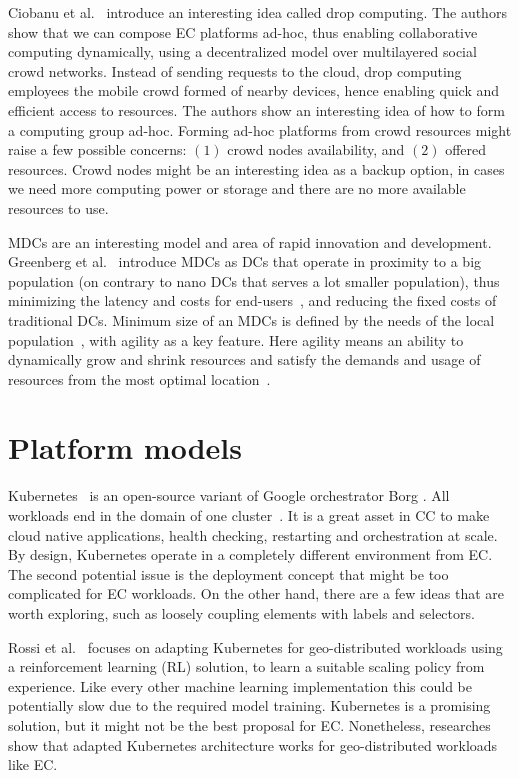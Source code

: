 Ciobanu et al.~\cite{CiobanuNPDMM19} introduce an interesting idea called drop computing. The authors show that we can compose EC platforms ad-hoc, thus enabling collaborative computing dynamically, using a decentralized model over multilayered social crowd networks. Instead of sending requests to the cloud, drop computing employees the mobile crowd formed of nearby devices, hence enabling quick and efficient access to resources. The authors show an interesting idea of how to form a computing group ad-hoc. Forming ad-hoc platforms from crowd resources might raise a few possible concerns: $(1)$ crowd nodes availability, and $(2)$ offered resources. Crowd nodes might be an interesting idea as a backup option, in cases we need more computing power or storage and there are no more available resources to use.

MDCs are an interesting model and area of rapid innovation and development. Greenberg et al.~\cite{GreenbergHMP09} introduce MDCs as DCs that operate in proximity to a big population (on contrary to nano DCs that serves a lot smaller population), thus minimizing the latency and costs for end-users~\cite{ShiHPANZ14, GreenbergHMP09}, 
and reducing the fixed costs of traditional DCs. Minimum size of an MDCs is defined by the needs of the local population~\cite{GreenbergHMP09, AbbasZTS18}, with agility as a key feature. Here agility means an ability to dynamically grow and shrink resources and satisfy the demands and usage of resources from the most optimal location~\cite{GreenbergHMP09}.
%
%
\section{Platform models}\label{sec:platform_models}
%
Kubernetes~\cite{BurnsGOBW16} is an open-source variant of Google orchestrator Borg \cite{VermaPKOTW15}.  All workloads end in the domain of one cluster~\cite{BurnsGOBW16, VermaPKOTW15, RossiCPN20}. It is a great asset in CC to make cloud native applications, health checking, restarting and orchestration at scale. By design, Kubernetes operate in a completely different environment from EC. The second potential issue is the deployment concept that might be too complicated for EC workloads. On the other hand, there are a few ideas that are worth exploring, such as loosely coupling elements with labels and selectors.

Rossi et al.~\cite{RossiCPN20} focuses on adapting Kubernetes for geo-distributed workloads using a reinforcement learning (RL) solution, to learn a suitable scaling policy from experience. Like every other machine learning implementation this could be potentially slow due to the required model training. Kubernetes is a promising solution, but it might not be the best proposal for EC. Nonetheless, researches show that adapted Kubernetes architecture works for geo-distributed workloads like EC.

